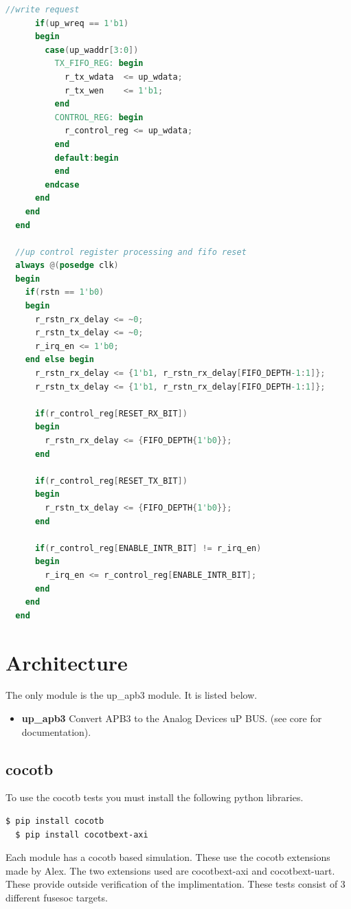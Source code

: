 \begin{lstlisting}[language=Verilog]
      //write request
      if(up_wreq == 1'b1)
      begin
        case(up_waddr[3:0])
          TX_FIFO_REG: begin
            r_tx_wdata  <= up_wdata;
            r_tx_wen    <= 1'b1;
          end
          CONTROL_REG: begin
            r_control_reg <= up_wdata;
          end
          default:begin
          end
        endcase
      end
    end
  end

  //up control register processing and fifo reset
  always @(posedge clk)
  begin
    if(rstn == 1'b0)
    begin
      r_rstn_rx_delay <= ~0;
      r_rstn_tx_delay <= ~0;
      r_irq_en <= 1'b0;
    end else begin
      r_rstn_rx_delay <= {1'b1, r_rstn_rx_delay[FIFO_DEPTH-1:1]};
      r_rstn_tx_delay <= {1'b1, r_rstn_rx_delay[FIFO_DEPTH-1:1]};

      if(r_control_reg[RESET_RX_BIT])
      begin
        r_rstn_rx_delay <= {FIFO_DEPTH{1'b0}};
      end

      if(r_control_reg[RESET_TX_BIT])
      begin
        r_rstn_tx_delay <= {FIFO_DEPTH{1'b0}};
      end

      if(r_control_reg[ENABLE_INTR_BIT] != r_irq_en)
      begin
        r_irq_en <= r_control_reg[ENABLE_INTR_BIT];
      end
    end
  end
\end{lstlisting}

\section{Architecture}
\par
The only module is the up\_apb3 module. It is listed below.

\begin{itemize}
  \item \textbf{up\_apb3} Convert APB3 to the Analog Devices uP BUS. (see core for documentation).
\end{itemize}

\par\subsection{cocotb}
\par
To use the cocotb tests you must install the following python libraries.
\begin{lstlisting}[language=bash]
  $ pip install cocotb
  $ pip install cocotbext-axi
\end{lstlisting}

Each module has a cocotb based simulation. These use the cocotb extensions made by Alex.
The two extensions used are cocotbext-axi and cocotbext-uart. These provide outside verification
of the implimentation. These tests consist of 3 different fusesoc targets.

